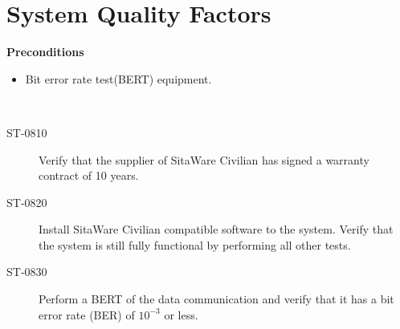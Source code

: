 \section{System Quality Factors}

\textbf{Preconditions}
\begin{itemize}
\item Bit error rate test(BERT) equipment.
\end{itemize}
~\

\begin{description}
\item[ST-0810] Verify that the supplier of SitaWare Civilian has signed a warranty contract of 10 years.
\item[ST-0820] Install SitaWare Civilian compatible software to the system. Verify that the system is still fully functional by performing all other tests. 
\item[ST-0830] Perform a BERT of the data communication and verify that it has a bit error rate (BER) of $10^{-3}$ or less. 
\end{description}
